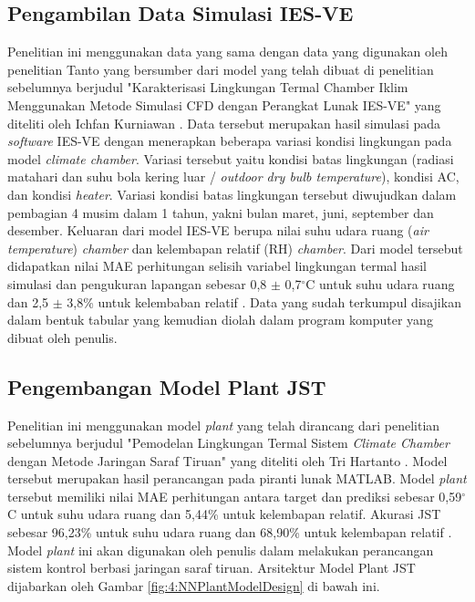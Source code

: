 \subsection{Pengambilan Data Simulasi IES-VE}
Penelitian ini menggunakan data yang sama dengan data yang digunakan oleh penelitian Tanto \cite{skripsiTanto} yang bersumber dari model yang telah dibuat di penelitian sebelumnya berjudul "Karakterisasi Lingkungan Termal Chamber Iklim Menggunakan Metode Simulasi CFD dengan Perangkat Lunak IES-VE" yang diteliti oleh Ichfan Kurniawan \cite{skripsiIchfan}.  Data tersebut merupakan hasil simulasi pada \textit{software} IES-VE dengan menerapkan beberapa variasi kondisi lingkungan pada model \textit{climate chamber}. Variasi tersebut yaitu kondisi batas lingkungan (radiasi matahari dan suhu bola kering luar / \textit{outdoor dry bulb temperature}), kondisi AC, dan kondisi \textit{heater}. Variasi kondisi batas lingkungan tersebut diwujudkan dalam pembagian 4 musim dalam 1 tahun, yakni bulan maret, juni, september dan desember. Keluaran dari model IES-VE berupa nilai suhu udara ruang (\textit{air temperature}) \textit{chamber} dan kelembapan relatif (RH) \textit{chamber}. Dari model tersebut didapatkan nilai MAE perhitungan selisih variabel lingkungan termal hasil simulasi dan pengukuran lapangan sebesar 0,8 $\pm$ 0,7$^{\circ}$C untuk suhu udara ruang dan 2,5 $\pm$ 3,8\% untuk kelembaban relatif \cite{skripsiIchfan}. Data yang sudah terkumpul disajikan dalam bentuk tabular yang kemudian diolah dalam program komputer yang dibuat oleh penulis.

\subsection{Pengembangan Model Plant JST}
Penelitian ini menggunakan model \textit{plant} yang telah dirancang dari penelitian sebelumnya berjudul "Pemodelan Lingkungan Termal Sistem \textit{Climate Chamber} dengan Metode Jaringan Saraf Tiruan" yang diteliti oleh Tri Hartanto \cite{skripsiTanto}. Model tersebut merupakan hasil perancangan pada piranti lunak MATLAB. Model \textit{plant} tersebut memiliki nilai MAE perhitungan antara target dan prediksi sebesar 0,59$^{\circ}$C untuk suhu udara ruang dan 5,44\% untuk kelembapan relatif. Akurasi JST sebesar 96,23\% untuk suhu udara ruang dan 68,90\% untuk kelembapan relatif \cite{skripsiTanto}. Model \textit{plant} ini akan digunakan oleh penulis dalam melakukan perancangan sistem kontrol berbasi jaringan saraf tiruan. Arsitektur Model Plant JST dijabarkan oleh Gambar \ref{fig:4:NNPlantModelDesign} di bawah ini.

